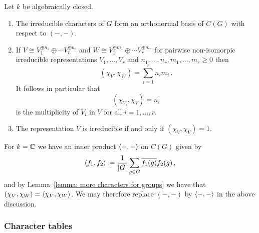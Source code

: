 \begin{theorem}
  Let $k$ be algebraically closed.
  \begin{enumerate}
    \item
      The irreducible characters of $G$ form an orthonormal basis of $C(G)$ with respect to $(-,-)$.
    \item
      If $V \cong V_1^{\oplus n_1} \oplus \dotsb V_r^{\oplus n_r}$ and $W \cong V_1^{\oplus m_1} \oplus \dotsb V_r^{\oplus m_r}$ for pairwise non-isomorpic irreducible representations $V_1, \dotsc, V_r$ and $n_1, \dotsc, n_r, m_1, \dotsc, m_r \geq 0$ then
      \[
          (\chi_V, \chi_W)
        = \sum_{i=1}^r n_i m_i \,.
      \]
      It follows in particular that
      \[
          (\chi_{V_i}, \chi_V)
        = n_i
      \]
      is the multiplicity of $V_i$ in $V$ for all $i = 1, \dotsc, r$.
    \item
      The representation $V$ is irreducible if and only if $(\chi_V, \chi_V) = 1$.
  \end{enumerate}
\end{theorem}


\begin{fluff}
  For $k = \mathbb{C}$ we have an inner product $\langle -,- \rangle$ on $C(G)$ given by
  \[
              \langle f_1, f_2 \rangle
    \coloneqq  \frac{1}{|G|} \sum_{g \in G} \overline{f_1(g)} f_2(g) \,,
  \]
   and by Lemma~\ref{lemma: more characters for groups} we have that $(\chi_V, \chi_W) = \langle \chi_V, \chi_W \rangle$.
   We may therefore replace $(-,-)$ by $\langle -,- \rangle$ in the above discussion.
\end{fluff}



\subsubsection{Character tables}


